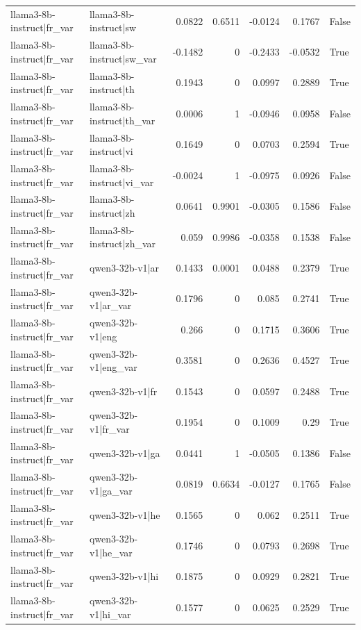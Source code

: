 \begin{table}
\begin{tabular}{l l r r r r l}
llama3-8b-instruct|fr_var & llama3-8b-instruct|sw & 0.0822 & 0.6511 & -0.0124 & 0.1767 & False \\
llama3-8b-instruct|fr_var & llama3-8b-instruct|sw_var & -0.1482 & 0 & -0.2433 & -0.0532 & True \\
llama3-8b-instruct|fr_var & llama3-8b-instruct|th & 0.1943 & 0 & 0.0997 & 0.2889 & True \\
llama3-8b-instruct|fr_var & llama3-8b-instruct|th_var & 0.0006 & 1 & -0.0946 & 0.0958 & False \\
llama3-8b-instruct|fr_var & llama3-8b-instruct|vi & 0.1649 & 0 & 0.0703 & 0.2594 & True \\
llama3-8b-instruct|fr_var & llama3-8b-instruct|vi_var & -0.0024 & 1 & -0.0975 & 0.0926 & False \\
llama3-8b-instruct|fr_var & llama3-8b-instruct|zh & 0.0641 & 0.9901 & -0.0305 & 0.1586 & False \\
llama3-8b-instruct|fr_var & llama3-8b-instruct|zh_var & 0.059 & 0.9986 & -0.0358 & 0.1538 & False \\
llama3-8b-instruct|fr_var & qwen3-32b-v1|ar & 0.1433 & 0.0001 & 0.0488 & 0.2379 & True \\
llama3-8b-instruct|fr_var & qwen3-32b-v1|ar_var & 0.1796 & 0 & 0.085 & 0.2741 & True \\
llama3-8b-instruct|fr_var & qwen3-32b-v1|eng & 0.266 & 0 & 0.1715 & 0.3606 & True \\
llama3-8b-instruct|fr_var & qwen3-32b-v1|eng_var & 0.3581 & 0 & 0.2636 & 0.4527 & True \\
llama3-8b-instruct|fr_var & qwen3-32b-v1|fr & 0.1543 & 0 & 0.0597 & 0.2488 & True \\
llama3-8b-instruct|fr_var & qwen3-32b-v1|fr_var & 0.1954 & 0 & 0.1009 & 0.29 & True \\
llama3-8b-instruct|fr_var & qwen3-32b-v1|ga & 0.0441 & 1 & -0.0505 & 0.1386 & False \\
llama3-8b-instruct|fr_var & qwen3-32b-v1|ga_var & 0.0819 & 0.6634 & -0.0127 & 0.1765 & False \\
llama3-8b-instruct|fr_var & qwen3-32b-v1|he & 0.1565 & 0 & 0.062 & 0.2511 & True \\
llama3-8b-instruct|fr_var & qwen3-32b-v1|he_var & 0.1746 & 0 & 0.0793 & 0.2698 & True \\
llama3-8b-instruct|fr_var & qwen3-32b-v1|hi & 0.1875 & 0 & 0.0929 & 0.2821 & True \\
llama3-8b-instruct|fr_var & qwen3-32b-v1|hi_var & 0.1577 & 0 & 0.0625 & 0.2529 & True \\

\end{tabular}
\end{table}

